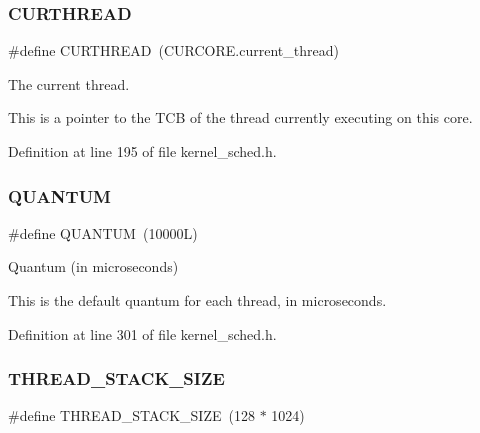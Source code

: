 \mbox{\label{group__scheduler_ga587a82c8931f0df72f43cc913ceb7e27}} 
\subsubsection{\texorpdfstring{C\+U\+R\+T\+H\+R\+E\+AD}{CURTHREAD}}
{\footnotesize\ttfamily \#define C\+U\+R\+T\+H\+R\+E\+AD~(C\+U\+R\+C\+O\+R\+E.\+current\+\_\+thread)}



The current thread. 

This is a pointer to the T\+CB of the thread currently executing on this core. 

Definition at line 195 of file kernel\+\_\+sched.\+h.

\mbox{\label{group__scheduler_gabc4f0f9abea1b5443308e4ea84b52b21}} 
\subsubsection{\texorpdfstring{Q\+U\+A\+N\+T\+UM}{QUANTUM}}
{\footnotesize\ttfamily \#define Q\+U\+A\+N\+T\+UM~(10000\+L)}



Quantum (in microseconds) 

This is the default quantum for each thread, in microseconds. 

Definition at line 301 of file kernel\+\_\+sched.\+h.

\mbox{\label{group__scheduler_ga90b7a8cb7bc3fdbd98014a3e15ee6e9a}} 
\subsubsection{\texorpdfstring{T\+H\+R\+E\+A\+D\+\_\+\+S\+T\+A\+C\+K\+\_\+\+S\+I\+ZE}{THREAD\_STACK\_SIZE}}
{\footnotesize\ttfamily \#define T\+H\+R\+E\+A\+D\+\_\+\+S\+T\+A\+C\+K\+\_\+\+S\+I\+ZE~(128 $\ast$ 1024)}



